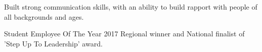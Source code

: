 {}
\begin{tightemize}
  \item Built strong communication skills, with an ability to build rapport with people of all backgrounds and ages.
  \item Student Employee Of The Year 2017 Regional winner and National finalist of 'Step Up To Leadership' award.
\end{tightemize}
\sectionsep
